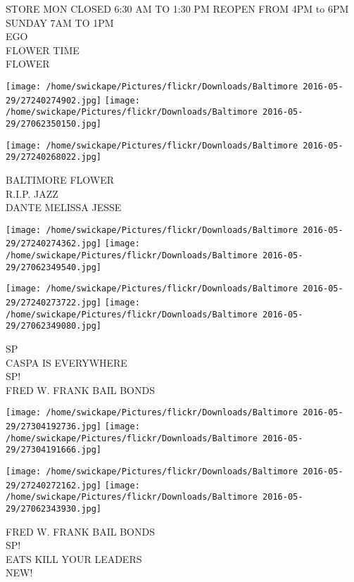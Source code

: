 \documentclass[10pt,letterpaper]{article}
\begin{document}
STORE MON CLOSED 6:30 AM TO 1:30 PM REOPEN FROM 4PM to 6PM SUNDAY 7AM TO 1PM\\
EGO\\
FLOWER TIME\\
FLOWER
\pagebreak

\texttt{[image: /home/swickape/Pictures/flickr/Downloads/Baltimore 2016-05-29/27240274902.jpg]}
\texttt{[image: /home/swickape/Pictures/flickr/Downloads/Baltimore 2016-05-29/27062350150.jpg]}

\vspace{0.25in}
\texttt{[image: /home/swickape/Pictures/flickr/Downloads/Baltimore 2016-05-29/27240268022.jpg]}

BALTIMORE FLOWER\\
R.I.P. JAZZ\\
DANTE MELISSA JESSE
\pagebreak

\texttt{[image: /home/swickape/Pictures/flickr/Downloads/Baltimore 2016-05-29/27240274362.jpg]}
\texttt{[image: /home/swickape/Pictures/flickr/Downloads/Baltimore 2016-05-29/27062349540.jpg]}

\texttt{[image: /home/swickape/Pictures/flickr/Downloads/Baltimore 2016-05-29/27240273722.jpg]}
\texttt{[image: /home/swickape/Pictures/flickr/Downloads/Baltimore 2016-05-29/27062349080.jpg]}

SP\\
CASPA IS EVERYWHERE\\
SP!\\
FRED W. FRANK BAIL BONDS
\pagebreak

\texttt{[image: /home/swickape/Pictures/flickr/Downloads/Baltimore 2016-05-29/27304192736.jpg]}
\texttt{[image: /home/swickape/Pictures/flickr/Downloads/Baltimore 2016-05-29/27304191666.jpg]}

\texttt{[image: /home/swickape/Pictures/flickr/Downloads/Baltimore 2016-05-29/27240272162.jpg]}
\texttt{[image: /home/swickape/Pictures/flickr/Downloads/Baltimore 2016-05-29/27062343930.jpg]}

FRED W. FRANK BAIL BONDS\\
SP!\\
EATS KILL YOUR LEADERS\\
NEW!
\pagebreak
\end{document}
